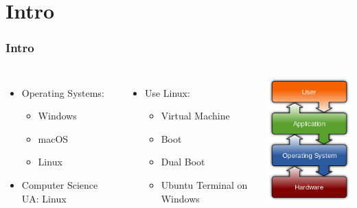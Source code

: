 

\section{Intro}
\begin{frame}
	\frametitle{Intro}

	\begin{columns}[c]
        	\begin{itemize}
            	\item Operating Systems:
                \begin{itemize}
            		\item Windows
                    \item macOS
                    \item Linux
            	\end{itemize}
                \item Computer Science UA: Linux
            \end{itemize}
            \begin{itemize}
                \item Use Linux:
                \begin{itemize}
            		\item Virtual Machine
                    \item Boot
                    \item Dual Boot
                    \item Ubuntu Terminal on Windows
            	\end{itemize}
            \end{itemize}
            \centering
			\includegraphics[width=.7\linewidth,]{res/os}
    \end{columns}


\end{frame}
